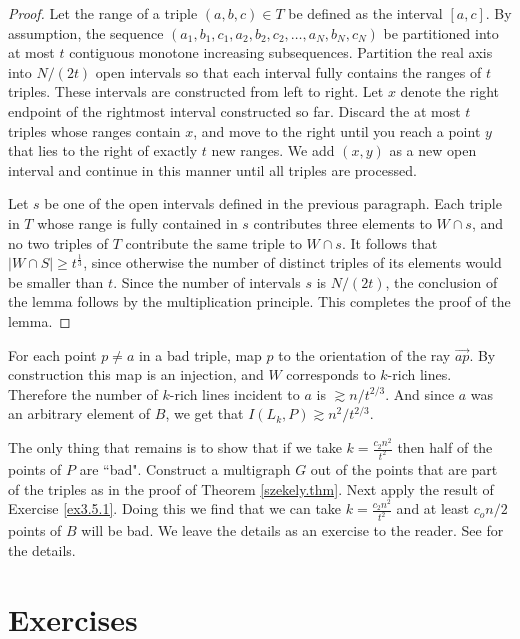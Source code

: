 \documentclass[]{stml-l}
\numberwithin{equation}{chapter}
\theoremstyle{plain}
\theoremstyle{definition}
\theoremstyle{remark}
\begin{document}
\begin{proof} Let the range of a triple $(a,b,c) \in T$ be defined
as the interval $[a,c]$. By assumption, the sequence
$(a_1,b_1,c_1,a_2,b_2,c_2, \dots, a_N,b_N,c_N)$ be partitioned
into at most $t$ contiguous monotone increasing subsequences.
Partition the real axis into $N/(2t)$ open intervals so that each
interval fully contains the ranges of $t$ triples. These intervals
are constructed from left to right. Let $x$ denote the right
endpoint of the rightmost interval constructed so far. Discard the
at most $t$ triples whose ranges contain $x$, and move to the
right until you reach a point $y$ that lies to the right of
exactly $t$ new ranges. We add $(x,y)$ as a new open interval and
continue in this manner until all triples are processed.

Let $s$ be one of the open intervals defined in the previous
paragraph. Each triple in $T$ whose range is fully contained in
$s$ contributes three elements to $W \cap s$, and no two triples
of $T$ contribute the same triple to $W \cap s$. It follows that
$|W \cap S| \ge t^{\frac{1}{3}}$, since otherwise the number of
distinct triples of its elements would be smaller than $t$. Since
the number of intervals $s$ is $N/(2t)$, the conclusion of the
lemma follows by the multiplication principle. This completes the
proof of the lemma. \end{proof}

For each point $p \neq a$ in a bad triple, map $p$ to the
orientation of the ray $\overrightarrow{ap}$.  By construction
this map is an injection, and $W$ corresponds to $k$-rich lines.
Therefore the number of $k$-rich lines incident to $a$ is $\gtrsim
n/t^{2/3}$. And since $a$ was an arbitrary element of $B$, we get
that $I(L_k, P) \gtrsim n^2/t^{2/3}$.

The only thing that remains is to show that if we take $k=
\frac{c_2n^2}{t^2}$ then half of the points of $P$ are ``bad".
Construct a multigraph $G$ out of the points that are part of the
triples as in the proof of Theorem \ref{szekely.thm}. Next apply
the result of Exercise \ref{ex3.5.1}. Doing this we
find that we can take $k= \frac{c_2n^2}{t^2}$ and at least
$c_on/2$ points of $B$ will be bad. We leave the details as an
exercise to the reader. See \cite{Sol} for the details.


\section*{Exercises}
\end{document}
